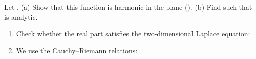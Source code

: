 \begin{EMexample}{}

Let .
(a) Show that this function is harmonic in the plane ().
(b) Find  such that  is analytic.

\begin{enumerate}
\def\labelenumi{(\alph{enumi})}
\item
  Check whether the real part satisfies the two-dimensional Laplace equation:
\item
  We use the Cauchy--Riemann relations:
\end{enumerate}

\end{EMexample}

\EMhold


